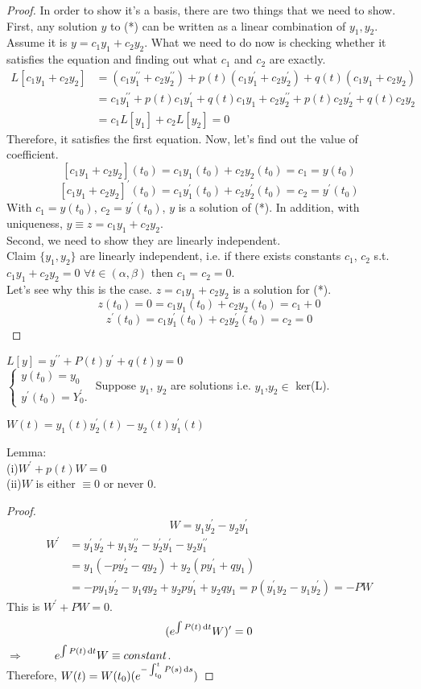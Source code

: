 \begin{proof}
In order to show it's a basis, there are two things that we need to show.
First, any solution $y$ to (*) can be written as a linear combination of $y_1,y_2$. Assume it is $y=c_1y_1+c_2y_2$. What we need to do now is checking whether it satisfies the equation and finding out what $c_1$ and $c_2$ are exactly.
\[\begin{aligned}
L[c_1y_1+c_2y_2]&=(c_1y_1^{\prime\prime}+c_2y_2^{\prime\prime})+p(t)(c_1y_1^\prime+c_2y_2^\prime)+q(t)(c_1y_1+c_2y_2)\\
&=c_1y_1^{\prime\prime}+p(t)c_1y_1^\prime+q(t)c_1y_1+c_2y_2^{\prime\prime}+p(t)c_2y_2^\prime+q(t)c_2y_2\\
&=c_1L[y_1]+c_2L[y_2]=0
\end{aligned}
\]
Therefore, it satisfies the first equation. Now, let's find out the value of coefficient.
\[[c_1y_1+c_2y_2](t_0)=c_1y_1(t_0)+c_2y_2(t_0)=c_1=y(t_0)
\]
\[[c_1y_1+c_2y_2]^\prime(t_0)=c_1y_1^\prime(t_0)+c_2y_2^\prime(t_0)=c_2=y^\prime(t_0)
\]
With $c_1=y(t_0)$, $c_2=y^\prime(t_0)$, $y$ is a solution of (*). In addition, with uniqueness, $y\equiv z=c_1y_1+c_2y_2$.\\
Second, we need to show they are linearly independent.\\
Claim $\{y_1,y_2\}$ are linearly independent, i.e. if there exists constants $c_1$, $c_2$ s.t. $c_1y_1+c_2y_2=0$ $\forall t\in(\alpha,\beta)$ then $c_1=c_2=0$.\\
Let's see why this is the case.
$z=c_1y_1+c_2y_2$ is a solution for (*).
\[z(t_0)=0=c_1y_1(t_0)+c_2y_2(t_0)=c_1+0
\]
\[z^\prime(t_0)=c_1y_1^\prime(t_0)+c_2y_2^\prime(t_0)=c_2=0
\]
\end{proof}
$L[y]=y^{\prime\prime}+P(t)y^\prime+q(t)y=0$\\

$\left \{	\begin{gathered}
y(t_0)=y_0\\
y^\prime(t_0)=Y_0^\prime.
\end{gathered}\right.$ 
Suppose $y_1$, $y_2$ are solutions i.e. $y_1$,$y_2\in$ ker(L).\\
\begin{definition}[Wronskian]$W(t)=y_1(t)y_2^\prime(t)-y_2(t)y_1^\prime(t)$\end{definition}
Lemma:\\
(i)$W^\prime+p(t)W=0$\\
(ii)$W$ is either $\equiv0$ or never 0.\\
\begin{proof}
\[W=y_1y_2^\prime-y_2y_1^\prime
\]
\[\begin{aligned}W^\prime&=y_1^\prime y_2^\prime+y_1y_2^{\prime\prime}-y_2^\prime  y_1^\prime-y_2y_1^{\prime\prime}\\
&=y_1(-py_2^\prime-qy_2)+y_2(py_1^\prime+qy_1)\\
&=-py_1y_2^\prime-y_1qy_2+y_2py_1^\prime+y_2qy_1=p(y_1^\prime y_2-y_1y_2^\prime)=-PW
\end{aligned}
\]
This is $W^\prime+PW=0$.
\[(e^{\int P(t)\,\mathrm{d} t}W)^\prime=0
\]
$\Rightarrow$ $\qquad$ $e^{\int P(t)\,\mathrm{d} t}W\equiv constant$.\\
Therefore, $W(t)=W(t_0)(e^{-\int_{t_0}^tP(s)\,\mathrm{d} s})$
\end{proof}

